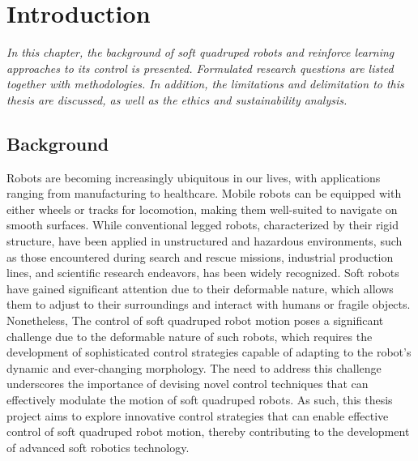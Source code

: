 \chapter{Introduction}
\label{chap1}
\textit{In this chapter, the background of soft quadruped robots and reinforce learning approaches to its control is presented. Formulated research questions are listed together with methodologies. In addition, the limitations and delimitation to this thesis are discussed, as well as the ethics and sustainability analysis.}

\section{Background}
Robots are becoming increasingly ubiquitous in our lives, with applications ranging from manufacturing to healthcare\cite{wangCurrentResearchesFuture2018}. Mobile robots can be equipped with either wheels or tracks for locomotion, making them well-suited to navigate on smooth surfaces\cite{liResearchMammalBionic2011}. While conventional legged robots, characterized by their rigid structure, have been applied in unstructured and hazardous environments, such as those encountered during search and rescue missions\cite{hawkesSoftRobotThat2017}, industrial production lines\cite{huDesignQuadrupedInspection2021}, and scientific research endeavors\cite{hewingLearningbasedModelPredictive2020}, has been widely recognized\cite{mengReviewQuadrupedRobots2016}. Soft robots have gained significant attention due to their deformable nature, which allows them to adjust to their surroundings and interact with humans or fragile objects\cite{muralidharanSoftQuadrupedRobot2021}. Nonetheless, The control of soft quadruped robot motion poses a significant challenge due to the deformable nature of such robots\cite{wangControlStrategiesSoft2022}, which requires the development of sophisticated control strategies capable of adapting to the robot's dynamic and ever-changing morphology\cite{wangControlStrategiesSoft2022}. The need to address this challenge underscores the importance of devising novel control techniques that can effectively modulate the motion of soft quadruped robots. As such, this thesis project aims to explore innovative control strategies that can enable effective control of soft quadruped robot motion, thereby contributing to the development of advanced soft robotics technology.

